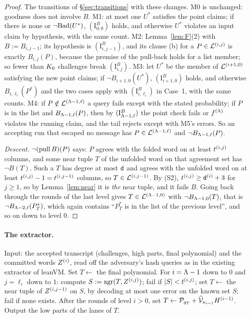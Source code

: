 \begin{proof}
The transitions of \S\ref{sec:transitions} with these changes. M0 is unchanged: goodness does not involve $B$. M1: at most one $U^\ast$ satisfies the point claims; if there is none or $\neg\mathrm{Bad}(U^\ast)$, $(\mathrm I^B_{0,0})$ holds, and otherwise $U^\ast$ violates an input claim by hypothesis, with the same count. M2: Lemma~\ref{lem:F}(2) with $B:=B_{i,j-1}$; its hypothesis is $(\mathrm I^B_{i,j-1})$, and its clause (b) for a $P\in\mathcal{L}^{(i,j)}$ is exactly $B_{i,j}(P)$, because the premise of the pull-back holds for a list member; so fewer than $K_0$ challenges break $(\mathrm I^B_{i,j})$. M3: let $U^\ast$ be the member of $\mathcal{L}^{(i+1,0)}$ satisfying the new point claims; if $\neg B_{i+1,0}(U^\ast)$, $(\mathrm I^B_{i+1,0})$ holds, and otherwise $B_{i,\ell_i}(P^\ast)$ and the two cases apply with $(\mathrm I^B_{i,\ell_i})$ in Case~1, with the same counts. M4: if $P\notin\mathcal{L}^{(\Lambda-1,\ell)}$ a query fails except with the stated probability; if $P$ is in the list and $B_{\Lambda-1,\ell}(P)$, then by $(\mathrm I^B_{\Lambda-1,\ell})$ the point check fails or $f^{(\Lambda)}$ violates the running claim, and the tail rejects except with M5's errors. So an accepting run that escaped no message has $P\in\mathcal{L}^{(\Lambda-1,\ell)}$ and $\neg B_{\Lambda-1,\ell}(P)$.

\emph{Descent.} $\neg(\operatorname{pull} B)(P)$ says: $P$ agrees with the folded word on at least $t^{(i,j)}$ columns, and some near tuple $T$ of the unfolded word on that agreement set has $\neg B(T)$. Such a $T$ has degree at most $\mathsf{d}$ and agrees with the unfolded word on at least $t^{(i,j)}-1=t^{(i,j-1)}$ columns, so $T\in\mathcal{L}^{(i,j-1)}$. By (S2), $t^{(i,j)}\ge\mathsf{d}^{(i)}+3$ for $j\ge1$, so by Lemma~\ref{lem:near} it is \emph{the} near tuple, and it fails $B$. Going back through the rounds of the last level gives $T\in\mathcal{L}^{(\Lambda-1,0)}$ with $\neg B_{\Lambda-1,0}(T)$, that is $\neg B_{\Lambda-2,\ell}(P^\ast_T)$, which again contains ``$P^\ast_T$ is in the list of the previous level'', and so on down to level $0$.
\end{proof}

\paragraph{The extractor.} Input: the accepted transcript (challenges, high parts, final polynomial) and the committed words $Z^{(i)}$, read off the adversary's hash queries as in the existing extractor of leanVM. Set $T\leftarrow$ the final polynomial. For $i=\Lambda-1$ down to $0$ and $j=\ell_i$ down to $1$: compute $S:=\operatorname{agr}(T,Z^{(i,j)})$; fail if $|S|<t^{(i,j)}$; set $T\leftarrow$ the near tuple of $Z^{(i,j-1)}$ on $S$, by decoding at most one error on the known set $S$; fail if none exists. After the rounds of level $i>0$, set $T\leftarrow\mathcal{P}_{g_T}+\widehat{\mathcal{V}}_{\kappa_{i-1}}H^{(i-1)}$. Output the low parts of the lanes of $T$.

